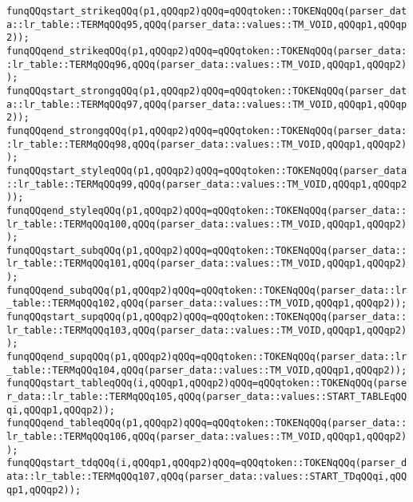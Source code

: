 \verb|funqQQqstart_strikeqQQq(p1,qQQqp2)qQQq=qQQqtoken::TOKENqQQq(parser_data::lr_table::TERMqQQq95,qQQq(parser_data::values::TM_VOID,qQQqp1,qQQqp2));|\newline
\verb|funqQQqend_strikeqQQq(p1,qQQqp2)qQQq=qQQqtoken::TOKENqQQq(parser_data::lr_table::TERMqQQq96,qQQq(parser_data::values::TM_VOID,qQQqp1,qQQqp2));|\newline
\verb|funqQQqstart_strongqQQq(p1,qQQqp2)qQQq=qQQqtoken::TOKENqQQq(parser_data::lr_table::TERMqQQq97,qQQq(parser_data::values::TM_VOID,qQQqp1,qQQqp2));|\newline
\verb|funqQQqend_strongqQQq(p1,qQQqp2)qQQq=qQQqtoken::TOKENqQQq(parser_data::lr_table::TERMqQQq98,qQQq(parser_data::values::TM_VOID,qQQqp1,qQQqp2));|\newline
\verb|funqQQqstart_styleqQQq(p1,qQQqp2)qQQq=qQQqtoken::TOKENqQQq(parser_data::lr_table::TERMqQQq99,qQQq(parser_data::values::TM_VOID,qQQqp1,qQQqp2));|\newline
\verb|funqQQqend_styleqQQq(p1,qQQqp2)qQQq=qQQqtoken::TOKENqQQq(parser_data::lr_table::TERMqQQq100,qQQq(parser_data::values::TM_VOID,qQQqp1,qQQqp2));|\newline
\verb|funqQQqstart_subqQQq(p1,qQQqp2)qQQq=qQQqtoken::TOKENqQQq(parser_data::lr_table::TERMqQQq101,qQQq(parser_data::values::TM_VOID,qQQqp1,qQQqp2));|\newline
\verb|funqQQqend_subqQQq(p1,qQQqp2)qQQq=qQQqtoken::TOKENqQQq(parser_data::lr_table::TERMqQQq102,qQQq(parser_data::values::TM_VOID,qQQqp1,qQQqp2));|\newline
\verb|funqQQqstart_supqQQq(p1,qQQqp2)qQQq=qQQqtoken::TOKENqQQq(parser_data::lr_table::TERMqQQq103,qQQq(parser_data::values::TM_VOID,qQQqp1,qQQqp2));|\newline
\verb|funqQQqend_supqQQq(p1,qQQqp2)qQQq=qQQqtoken::TOKENqQQq(parser_data::lr_table::TERMqQQq104,qQQq(parser_data::values::TM_VOID,qQQqp1,qQQqp2));|\newline
\verb|funqQQqstart_tableqQQq(i,qQQqp1,qQQqp2)qQQq=qQQqtoken::TOKENqQQq(parser_data::lr_table::TERMqQQq105,qQQq(parser_data::values::START_TABLEqQQqi,qQQqp1,qQQqp2));|\newline
\verb|funqQQqend_tableqQQq(p1,qQQqp2)qQQq=qQQqtoken::TOKENqQQq(parser_data::lr_table::TERMqQQq106,qQQq(parser_data::values::TM_VOID,qQQqp1,qQQqp2));|\newline
\verb|funqQQqstart_tdqQQq(i,qQQqp1,qQQqp2)qQQq=qQQqtoken::TOKENqQQq(parser_data::lr_table::TERMqQQq107,qQQq(parser_data::values::START_TDqQQqi,qQQqp1,qQQqp2));|\newline
